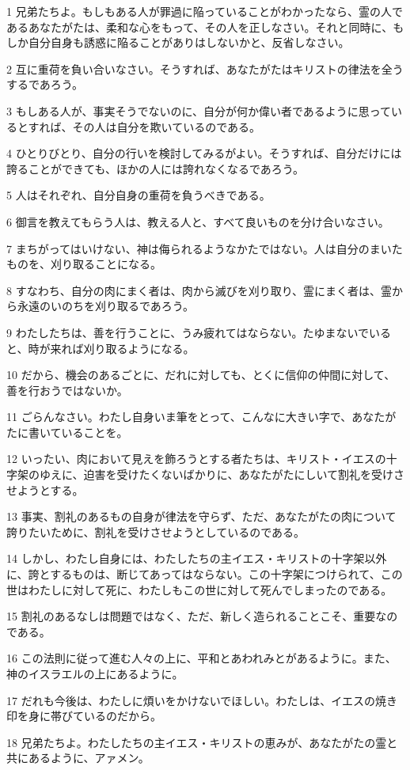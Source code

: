 \par 1 兄弟たちよ。もしもある人が罪過に陥っていることがわかったなら、霊の人であるあなたがたは、柔和な心をもって、その人を正しなさい。それと同時に、もしか自分自身も誘惑に陥ることがありはしないかと、反省しなさい。
\par 2 互に重荷を負い合いなさい。そうすれば、あなたがたはキリストの律法を全うするであろう。
\par 3 もしある人が、事実そうでないのに、自分が何か偉い者であるように思っているとすれば、その人は自分を欺いているのである。
\par 4 ひとりびとり、自分の行いを検討してみるがよい。そうすれば、自分だけには誇ることができても、ほかの人には誇れなくなるであろう。
\par 5 人はそれぞれ、自分自身の重荷を負うべきである。
\par 6 御言を教えてもらう人は、教える人と、すべて良いものを分け合いなさい。
\par 7 まちがってはいけない、神は侮られるようなかたではない。人は自分のまいたものを、刈り取ることになる。
\par 8 すなわち、自分の肉にまく者は、肉から滅びを刈り取り、霊にまく者は、霊から永遠のいのちを刈り取るであろう。
\par 9 わたしたちは、善を行うことに、うみ疲れてはならない。たゆまないでいると、時が来れば刈り取るようになる。
\par 10 だから、機会のあるごとに、だれに対しても、とくに信仰の仲間に対して、善を行おうではないか。
\par 11 ごらんなさい。わたし自身いま筆をとって、こんなに大きい字で、あなたがたに書いていることを。
\par 12 いったい、肉において見えを飾ろうとする者たちは、キリスト・イエスの十字架のゆえに、迫害を受けたくないばかりに、あなたがたにしいて割礼を受けさせようとする。
\par 13 事実、割礼のあるもの自身が律法を守らず、ただ、あなたがたの肉について誇りたいために、割礼を受けさせようとしているのである。
\par 14 しかし、わたし自身には、わたしたちの主イエス・キリストの十字架以外に、誇とするものは、断じてあってはならない。この十字架につけられて、この世はわたしに対して死に、わたしもこの世に対して死んでしまったのである。
\par 15 割礼のあるなしは問題ではなく、ただ、新しく造られることこそ、重要なのである。
\par 16 この法則に従って進む人々の上に、平和とあわれみとがあるように。また、神のイスラエルの上にあるように。
\par 17 だれも今後は、わたしに煩いをかけないでほしい。わたしは、イエスの焼き印を身に帯びているのだから。
\par 18 兄弟たちよ。わたしたちの主イエス・キリストの恵みが、あなたがたの霊と共にあるように、アァメン。


